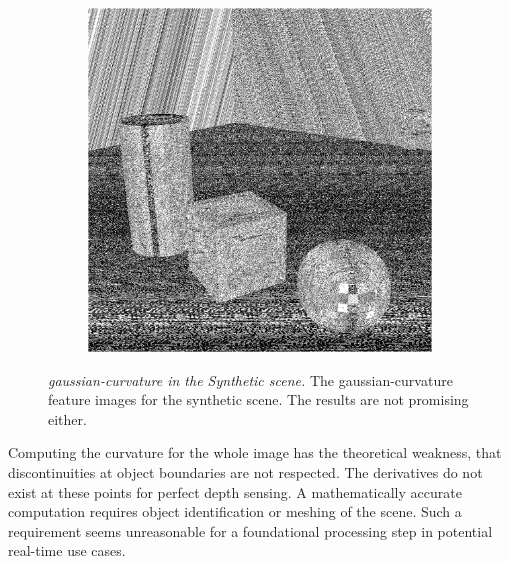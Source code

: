\begin{figure}[H]
\begin{subfigure}[t]{0.32\textwidth}
    \end{subfigure}
    \begin{subfigure}[t]{0.32\textwidth}
        \includegraphics[width=\linewidth]{chapter04/img/gauss-0210.png}
    \end{subfigure}
    \caption[\Gls{gaussian-curvature} in the \emph{Synthetic} scene]{\emph{\Gls{gaussian-curvature} in the Synthetic scene.} The \Gls{gaussian-curvature} feature images for the synthetic scene. The results are not promising either.}\label{fig:gaussian-curvature}
\end{figure}
Computing the curvature for the whole image has the theoretical weakness, that discontinuities at object boundaries are not respected.
The derivatives do not exist at these points for perfect depth sensing.
A mathematically accurate computation requires object identification or meshing of the scene.
Such a requirement seems unreasonable for a foundational processing step in potential real-time use cases.
